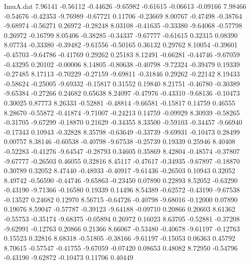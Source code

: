 \begin{filecontents}{ImuA.dat}
   7.96141   -0.56112   -0.44626   -9.65982   -0.61615   -0.06613   -0.09166
   7.98466   -0.54676   -0.42353   -9.76989   -0.67721    0.11706   -0.23669
   8.00767   -0.47498   -0.38764   -9.68974   -0.56271    0.26972   -0.28248
   8.03108   -0.41635   -0.33380   -9.64068   -0.57798    0.26972   -0.16799
   8.05406   -0.38285   -0.34337   -9.67777   -0.61615    0.32315    0.08390
   8.07734   -0.33380   -0.39482   -9.61556   -0.50165    0.36132    0.29762
   8.10054   -0.39601   -0.45703   -9.64786   -0.41769    0.29262    0.25183
   8.12491   -0.66281   -0.44746   -9.67059   -0.43295    0.20102   -0.00006
   8.14805   -0.80638   -0.40798   -9.72324   -0.39479    0.19339   -0.27485
   8.17113   -0.70229   -0.27159   -9.69811   -0.31846    0.29262   -0.22142
   8.19433   -0.58624   -0.25005   -9.69332   -0.15817    0.31552    0.19840
   8.21751   -0.46780   -0.30389   -9.65384   -0.27266    0.24682    0.65638
   8.24097   -0.47976   -0.43310   -9.68136   -0.10473    0.30025    0.87773
   8.26333   -0.52881   -0.48814   -9.66581   -0.15817    0.14759    0.46555
   8.28670   -0.55872   -0.41874   -9.71007   -0.24213    0.14759   -0.09929
   8.30939   -0.58265   -0.31705   -9.67299   -0.18870    0.21629   -0.34355
   8.33500   -0.59103   -0.34457   -9.66940   -0.17343    0.10943   -0.32828
   8.35798   -0.63649   -0.33739   -9.69931   -0.10473    0.28499    0.00757
   8.38146   -0.60538   -0.40798   -9.67538   -0.25739    0.19339    0.25946
   8.40408   -0.52283   -0.41276   -9.64547   -0.28793    0.34605    0.35869
   8.42804   -0.48574   -0.37807   -9.67777   -0.26503    0.46055    0.32816
   8.45117   -0.47617   -0.34935   -9.67897   -0.18870    0.30789    0.32052
   8.47440   -0.48933   -0.40917   -9.61436   -0.26503    0.10943    0.32052
   8.49742   -0.56590   -0.44746   -9.65863   -0.23450    0.07890    0.22893
   8.52052   -0.63290   -0.43190   -9.71366   -0.16580    0.19339    0.14496
   8.54389   -0.62572   -0.43190   -9.67538   -0.13527    0.24682    0.12970
   8.56715   -0.64726   -0.40798   -9.68016   -0.12000    0.07890    0.19076
   8.59047   -0.57787   -0.39123   -9.64188   -0.09710    0.20866    0.20603
   8.61362   -0.55753   -0.35174   -9.68375   -0.05894    0.26972    0.16023
   8.63705   -0.52881   -0.37208   -9.62991   -0.12763    0.20866    0.21366
   8.66067   -0.53480   -0.40678   -9.61197   -0.12763    0.15523    0.32816
   8.68318   -0.51805   -0.38166   -9.61197   -0.15053    0.06363    0.45792
   8.70615   -0.57547   -0.41755   -9.67059   -0.07420    0.08653    0.48082
   8.72950   -0.54796   -0.43190   -9.62872   -0.10473    0.11706    0.40449

\end{filecontents}
